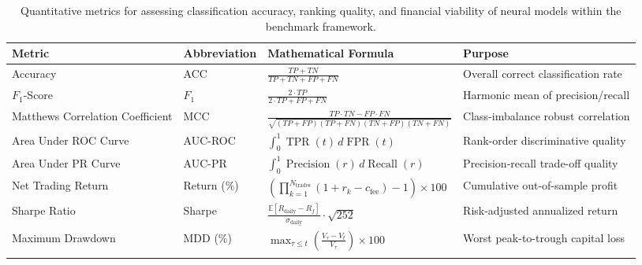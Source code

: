 \ifdefined\methodresultscompact\else
\begin{table}[htbp]
\caption{Quantitative metrics for assessing classification accuracy, ranking quality, and financial viability of neural models within the benchmark framework.}
\label{tab:metrics_formulation}
\centering
\small
\setlength{\tabcolsep}{3pt}
\begin{tabularx}{\textwidth}{@{}L l L L@{}}
\toprule
Metric & Abbreviation & Mathematical Formula & Purpose \\
\midrule
Accuracy & ACC & $\frac{TP + TN}{TP + TN + FP + FN}$ & Overall correct classification rate \\
$F_1$-Score & $F_1$ & $\frac{2 \cdot TP}{2 \cdot TP + FP + FN}$ & Harmonic mean of precision/recall \\
Matthews Correlation Coefficient & MCC & $\frac{TP \cdot TN - FP \cdot FN}{\sqrt{(TP{+}FP)(TP{+}FN)(TN{+}FP)(TN{+}FN)}}$ & Class-imbalance robust correlation \\
Area Under ROC Curve & AUC-ROC & $\int_0^1 \operatorname{TPR}(t) \, d\operatorname{FPR}(t)$ & Rank-order discriminative quality \\
Area Under PR Curve & AUC-PR & $\int_0^1 \operatorname{Precision}(r) \, d\operatorname{Recall}(r)$ & Precision-recall trade-off quality \\
Net Trading Return & Return (\%) & $\left( \prod_{k=1}^{N_{\text{trades}}} (1 + r_k - c_{\text{fee}}) - 1 \right) \times 100$ & Cumulative out-of-sample profit \\
Sharpe Ratio & Sharpe & $\frac{\mathbb{E}[R_{\text{daily}} - R_f]}{\sigma_{\text{daily}}} \cdot \sqrt{252}$ & Risk-adjusted annualized return \\
Maximum Drawdown & MDD (\%) & $\max_{\tau \le t} \left( \frac{V_\tau - V_t}{V_\tau} \right) \times 100$ & Worst peak-to-trough capital loss \\
\botrule
\end{tabularx}
\end{table}
\fi
